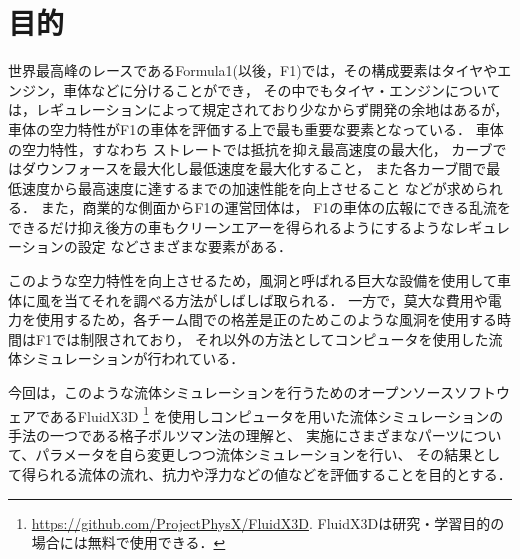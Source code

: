 \documentclass[main]{subfiles}
\begin{document}
\chapter{目的}

世界最高峰のレースであるFormula1(以後，F1)では，その構成要素はタイヤやエンジン，車体などに分けることができ，
その中でもタイヤ・エンジンについては，レギュレーションによって規定されており少なからず開発の余地はあるが，車体の空力特性がF1の車体を評価する上で最も重要な要素となっている．\cite{ref:f1-wind-tunnel}
車体の空力特性，すなわち
ストレートでは抵抗を抑え最高速度の最大化，
カーブではダウンフォースを最大化し最低速度を最大化すること，
また各カーブ間で最低速度から最高速度に達するまでの加速性能を向上させること
などが求められる．
また，商業的な側面からF1の運営団体は，
F1の車体の広報にできる乱流をできるだけ抑え後方の車もクリーンエアーを得られるようにするようなレギュレーションの設定
などさまざまな要素がある．

このような空力特性を向上させるため，風洞と呼ばれる巨大な設備を使用して車体に風を当てそれを調べる方法がしばしば取られる．
一方で，莫大な費用や電力を使用するため，各チーム間での格差是正のためこのような風洞を使用する時間はF1では制限されており，\cite{ref:f1-sporting-regulations}
それ以外の方法としてコンピュータを使用した流体シミュレーションが行われている．

今回は，このような流体シミュレーションを行うためのオープンソースソフトウェアであるFluidX3D
\footnote{
    \url{https://github.com/ProjectPhysX/FluidX3D}.
    FluidX3Dは研究・学習目的の場合には無料で使用できる．
}
を使用しコンピュータを用いた流体シミュレーションの手法の一つである格子ボルツマン法の理解と、
実施にさまざまなパーツについて、パラメータを自ら変更しつつ流体シミュレーションを行い、
その結果として得られる流体の流れ、抗力や浮力などの値などを評価することを目的とする．
\end{document}
